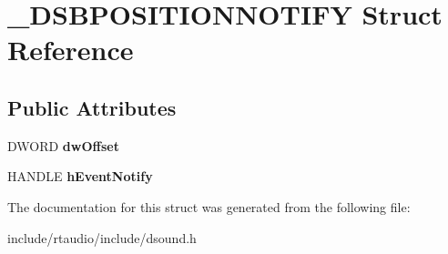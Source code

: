 \hypertarget{struct___d_s_b_p_o_s_i_t_i_o_n_n_o_t_i_f_y}{}\section{\+\_\+\+D\+S\+B\+P\+O\+S\+I\+T\+I\+O\+N\+N\+O\+T\+I\+FY Struct Reference}
\label{struct___d_s_b_p_o_s_i_t_i_o_n_n_o_t_i_f_y}
\subsection*{Public Attributes}
\begin{DoxyCompactItemize}
\item 
D\+W\+O\+RD {\bfseries dw\+Offset}\hypertarget{struct___d_s_b_p_o_s_i_t_i_o_n_n_o_t_i_f_y_a331f7394fae18a74b52287e0113cfc98}{}\label{struct___d_s_b_p_o_s_i_t_i_o_n_n_o_t_i_f_y_a331f7394fae18a74b52287e0113cfc98}

\item 
H\+A\+N\+D\+LE {\bfseries h\+Event\+Notify}\hypertarget{struct___d_s_b_p_o_s_i_t_i_o_n_n_o_t_i_f_y_ad6aec8782b91448424dcdcf252218ef1}{}\label{struct___d_s_b_p_o_s_i_t_i_o_n_n_o_t_i_f_y_ad6aec8782b91448424dcdcf252218ef1}

\end{DoxyCompactItemize}


The documentation for this struct was generated from the following file\+:\begin{DoxyCompactItemize}
\item 
include/rtaudio/include/dsound.\+h\end{DoxyCompactItemize}
